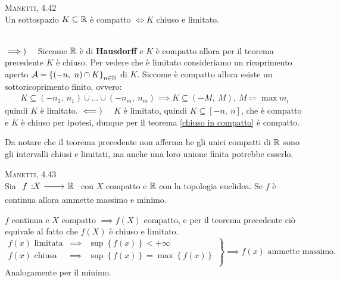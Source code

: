 \begin{theorema}\textsc{Manetti, 4.42} \label{compatto chiuso e limitato R}\\
	Un sottospazio $K\subseteq \mathbb{R}$ è compatto $\iff K$ chiuso e limitato.
\end{theorema}
\begin{demonstration}~{}\\
	$\implies)\quad$ Siccome $\mathbb{R}$ è di \textbf{Hausdorff} e $K$ è compatto allora per il teorema precedente $K$ è chiuso.\newline
	Per vedere che è limitato consideriamo un ricoprimento aperto $\mathcal{A}=\left\{ (-n,\ n)\cap K\right\}_{n\in\mathbb{N}}$ di $K$. Siccome è compatto allora esiste un sottoricoprimento finito, ovvero:
	\begin{gather*}
		K\subseteq (-n_1,\ n_1)\cup\dots\cup(-n_m,\ n_m) \implies K\subseteq (-M,\ M), \ M\coloneqq \max m_i
	\end{gather*}
	quindi $K$ è limitato. \newline
	$\impliedby)\quad $ $K$ è limitato, quindi $K\subseteq [-n, \ n]$, che è compatto e $K$ è chiuso per ipotesi, dunque per il teorema \ref{chiuso in compatto} è compatto.
\end{demonstration}
\begin{observe}
	Da notare che il teorema precedente non afferma he gli unici compatti di $\mathbb{R}$ sono gli intervalli chiusi e limitati, ma anche una loro unione finita potrebbe esserlo.
\end{observe}

\begin{theorema} \textsc{Manetti, 4.43} \label{weierstrass} \\
	Sia $\funz f X \realset$ con $X$ compatto e $\mathbb{R}$ con la topologia euclidea. Se $f$ è continua allora ammette massimo e minimo.
\end{theorema}
\begin{demonstration}
	$f$ continua e $X$ compatto $\implies f(X)$ compatto, e per il teorema precedente ciò equivale al fatto che $f(X)$ è chiuso e limitato.
	\begin{equation*}
		\left.
		\begin{array}{lcl}
			f\left(x\right)\text{ limitata}&\implies& \sup \left\{f\left(x\right)\right\}<+\infty\\
			f\left(x\right)\text{ chiusa}&\implies& \sup \left\{f\left(x\right)\right\}=\max \left\{f\left(x\right)\right\}\\
		\end{array}
		\right\}
		\implies f\left(x\right)\text{ ammette massimo.}
	\end{equation*}
	Analogamente per il minimo.
\end{demonstration}

